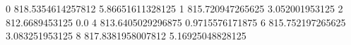 0 818.5354614257812 5.86651611328125
1 815.720947265625 3.052001953125
2 812.6689453125 0.0
4 813.6405029296875 0.9715576171875
6 815.752197265625 3.083251953125
8 817.8381958007812 5.16925048828125
